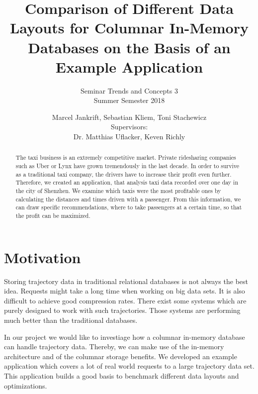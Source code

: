 \documentclass[10pt]{sig-alternate}
\begin{document}

\title{
  \vspace{24pt}
  Comparison of Different Data Layouts for Columnar In-Memory Databases on the Basis of an Example Application
}
\subtitle{
  Seminar Trends and Concepts 3\\
  Summer Semester 2018
}


\author{
  Marcel Jankrift, Sebastian Kliem, Toni Stachewicz\\[12pt]
  Supervisors:\\
  Dr. Matthias Uflacker, Keven Richly
}

\maketitle
\begin{abstract}
The taxi business is an extremely competitive market. Private ridesharing companies such as Uber or Lynx have grown tremendously in the last decade. In order to survive as a traditional taxi company, the drivers have to increase their profit even further. Therefore, we created an application, that analysis taxi data recorded over one day in the city of Shenzhen. We examine which taxis were the most profitable ones by calculating the distances and times driven with a passenger. From this information, we can draw specific recommendations, where to take passengers at a certain time, so that the profit can be maximized.
\end{abstract}


\section{Motivation}

Storing trajectory data in traditional relational databases is not always the best idea. Requests might take a long time when working on big data sets. It is also difficult to achieve good compression rates. There exist some systems which are purely designed to work with such trajectories. Those systems are performing much better than the traditional databases.

In our project we would like to investiage how a columnar in-memory database can handle trajectory data. Thereby, we can make use of the in-memory architecture and of the columnar storage benefits. We developed an example application which covers a lot of real world requests to a large trajectory data set. This application builds a good basis to benchmark different data layouts and optimizations.
\end{document}
